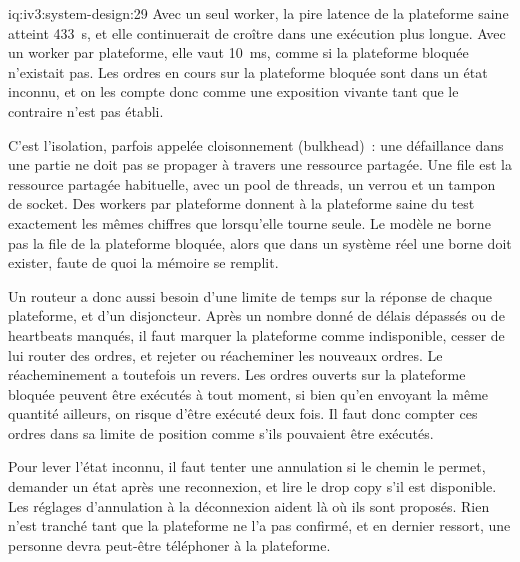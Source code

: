 \begin{solution}{iq:iv3:system-design:29}
Avec un seul worker, la pire latence de la plateforme saine atteint 433~s, et elle continuerait de croître dans une exécution plus longue. Avec un worker par plateforme, elle vaut 10~ms, comme si la plateforme bloquée n'existait pas. Les ordres en cours sur la plateforme bloquée sont dans un état inconnu, et on les compte donc comme une exposition vivante tant que le contraire n'est pas établi.
\label{lst:iv3:sd:bulkhead}

C'est l'isolation, parfois appelée cloisonnement (bulkhead)~: une défaillance dans une partie ne doit pas se propager à travers une ressource partagée. Une file est la ressource partagée habituelle, avec un pool de threads, un verrou et un tampon de socket. Des workers par plateforme donnent à la plateforme saine du test exactement les mêmes chiffres que lorsqu'elle tourne seule. Le modèle ne borne pas la file de la plateforme bloquée, alors que dans un système réel une borne doit exister, faute de quoi la mémoire se remplit.

Un routeur a donc aussi besoin d'une limite de temps sur la réponse de chaque plateforme, et d'un disjoncteur. Après un nombre donné de délais dépassés ou de heartbeats manqués, il faut marquer la plateforme comme indisponible, cesser de lui router des ordres, et rejeter ou réacheminer les nouveaux ordres. Le réacheminement a toutefois un revers. Les ordres ouverts sur la plateforme bloquée peuvent être exécutés à tout moment, si bien qu'en envoyant la même quantité ailleurs, on risque d'être exécuté deux fois. Il faut donc compter ces ordres dans sa limite de position comme s'ils pouvaient être exécutés.

Pour lever l'état inconnu, il faut tenter une annulation si le chemin le permet, demander un état après une reconnexion, et lire le drop copy s'il est disponible. Les réglages d'annulation à la déconnexion aident là où ils sont proposés. Rien n'est tranché tant que la plateforme ne l'a pas confirmé, et en dernier ressort, une personne devra peut-être téléphoner à la plateforme.

\end{solution}

